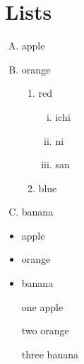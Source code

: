 \documentclass{article}
\begin{document}
\section{Lists}
	\begin{enumerate}[A.]%
		\item apple %
		\item orange %
		\begin{enumerate}
			\item red
			\begin{enumerate}[i)]
				\item ichi
				\item ni
				\item san %
			\end{enumerate}
			\item blue
		\end{enumerate}\setcounter{enumi}{5}
		\item banana
	\end{enumerate}
	\begin{itemize}
	\item apple %
	\item orange %
	\item banana
\end{itemize}
	\begin{itemize}
	\item[one] apple %
	\item[two] orange %
	\item[three] banana
\end{itemize}
\end{document}
